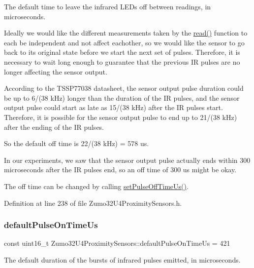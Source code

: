 The default time to leave the infrared L\+E\+Ds off between readings, in microseconds. 

Ideally we would like the different measurements taken by the \hyperlink{class_zumo32_u4_proximity_sensors_a071d935e10e2a16a3ae2559d16a12683}{read()} function to each be independent and not affect eachother, so we would like the sensor to go back to its original state before we start the next set of pulses. Therefore, it is necessary to wait long enough to guarantee that the previous IR pulses are no longer affecting the sensor output.

According to the T\+S\+S\+P77038 datasheet, the sensor output pulse duration could be up to 6/(38 k\+Hz) longer than the duration of the IR pulses, and the sensor output pulse could start as late as 15/(38 k\+Hz) after the IR pulses start. Therefore, it is possible for the sensor output pulse to end up to 21/(38 k\+Hz) after the ending of the IR pulses.

So the default off time is 22/(38 k\+Hz) = 578 us.

In our experiments, we saw that the sensor output pulse actually ends within 300 microseconds after the IR pulses end, so an off time of 300 us might be okay.

The off time can be changed by calling \hyperlink{class_zumo32_u4_proximity_sensors_a4d7911aca58734a76be212de103a1387}{set\+Pulse\+Off\+Time\+Us()}. 

Definition at line 238 of file Zumo32\+U4\+Proximity\+Sensors.\+h.

\mbox{\label{class_zumo32_u4_proximity_sensors_a6d47a41b45a7088916fbeaa5b38c60b3}} 
\subsubsection{\texorpdfstring{default\+Pulse\+On\+Time\+Us}{defaultPulseOnTimeUs}}
{\footnotesize\ttfamily const uint16\+\_\+t Zumo32\+U4\+Proximity\+Sensors\+::default\+Pulse\+On\+Time\+Us = 421\hspace{0.3cm}{\ttfamily [static]}}



The default duration of the bursts of infrared pulses emitted, in microseconds. 

